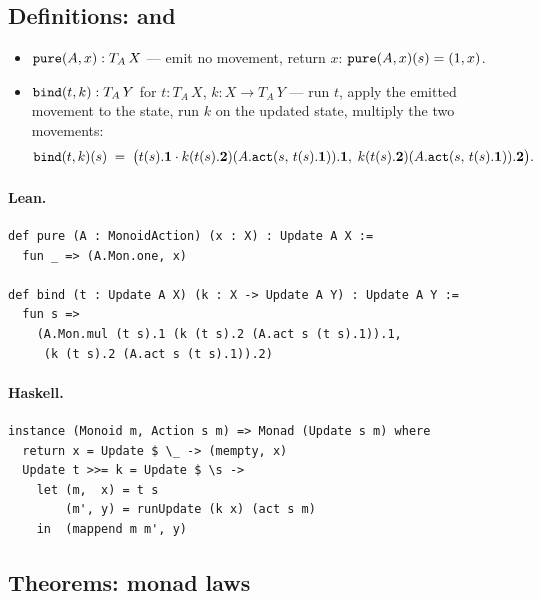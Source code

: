 \documentclass[11pt,a4paper]{article}
\begin{document}
\subsection{Definitions:  and }

\begin{defn}
\begin{itemize}
  \item $\texttt{pure}(A, x) : T_A\, X$ --- emit no movement, return $x$:
    $\texttt{pure}(A, x)(s) = (1, x)$.
  \item $\texttt{bind}(t, k) : T_A\, Y$ for $t : T_A\, X$, $k : X \to T_A\, Y$
    --- run $t$, apply the emitted movement to the state, run $k$ on the
    updated state, multiply the two movements:
    \[
      \texttt{bind}(t, k)(s) \;=\;
      \bigl(t(s).\mathbf{1} \cdot k(t(s).\mathbf{2})(A.\texttt{act}(s,\, t(s).\mathbf{1})).\mathbf{1},\;
      k(t(s).\mathbf{2})(A.\texttt{act}(s,\, t(s).\mathbf{1})).\mathbf{2}\bigr).
    \]
\end{itemize}
\end{defn}

\paragraph{Lean.}
\begin{lstlisting}[style=lean]
def pure (A : MonoidAction) (x : X) : Update A X :=
  fun _ => (A.Mon.one, x)

def bind (t : Update A X) (k : X -> Update A Y) : Update A Y :=
  fun s =>
    (A.Mon.mul (t s).1 (k (t s).2 (A.act s (t s).1)).1,
     (k (t s).2 (A.act s (t s).1)).2)
\end{lstlisting}

\paragraph{Haskell.}
\begin{lstlisting}[style=haskell]
instance (Monoid m, Action s m) => Monad (Update s m) where
  return x = Update $ \_ -> (mempty, x)
  Update t >>= k = Update $ \s ->
    let (m,  x) = t s
        (m', y) = runUpdate (k x) (act s m)
    in  (mappend m m', y)
\end{lstlisting}


\subsection{Theorems: monad laws}
\end{document}
